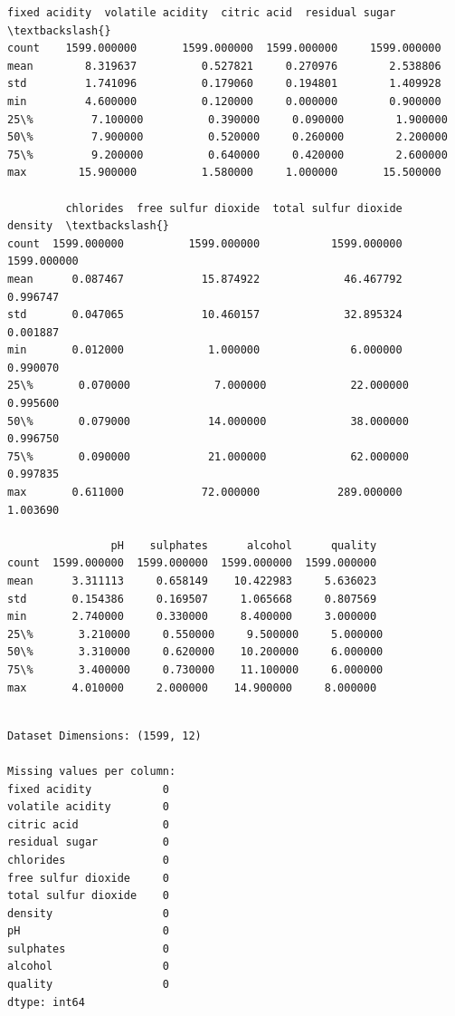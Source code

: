 \documentclass[11pt]{article}
\begin{document}
    
    \begin{Verbatim}[commandchars=\\\{\}]
       fixed acidity  volatile acidity  citric acid  residual sugar  \textbackslash{}
count    1599.000000       1599.000000  1599.000000     1599.000000   
mean        8.319637          0.527821     0.270976        2.538806   
std         1.741096          0.179060     0.194801        1.409928   
min         4.600000          0.120000     0.000000        0.900000   
25\%         7.100000          0.390000     0.090000        1.900000   
50\%         7.900000          0.520000     0.260000        2.200000   
75\%         9.200000          0.640000     0.420000        2.600000   
max        15.900000          1.580000     1.000000       15.500000   

         chlorides  free sulfur dioxide  total sulfur dioxide      density  \textbackslash{}
count  1599.000000          1599.000000           1599.000000  1599.000000   
mean      0.087467            15.874922             46.467792     0.996747   
std       0.047065            10.460157             32.895324     0.001887   
min       0.012000             1.000000              6.000000     0.990070   
25\%       0.070000             7.000000             22.000000     0.995600   
50\%       0.079000            14.000000             38.000000     0.996750   
75\%       0.090000            21.000000             62.000000     0.997835   
max       0.611000            72.000000            289.000000     1.003690   

                pH    sulphates      alcohol      quality  
count  1599.000000  1599.000000  1599.000000  1599.000000  
mean      3.311113     0.658149    10.422983     5.636023  
std       0.154386     0.169507     1.065668     0.807569  
min       2.740000     0.330000     8.400000     3.000000  
25\%       3.210000     0.550000     9.500000     5.000000  
50\%       3.310000     0.620000    10.200000     6.000000  
75\%       3.400000     0.730000    11.100000     6.000000  
max       4.010000     2.000000    14.900000     8.000000  
    \end{Verbatim}

    
    \begin{Verbatim}[commandchars=\\\{\}]

Dataset Dimensions: (1599, 12)

Missing values per column:
fixed acidity           0
volatile acidity        0
citric acid             0
residual sugar          0
chlorides               0
free sulfur dioxide     0
total sulfur dioxide    0
density                 0
pH                      0
sulphates               0
alcohol                 0
quality                 0
dtype: int64
    \end{Verbatim}
\end{document}
